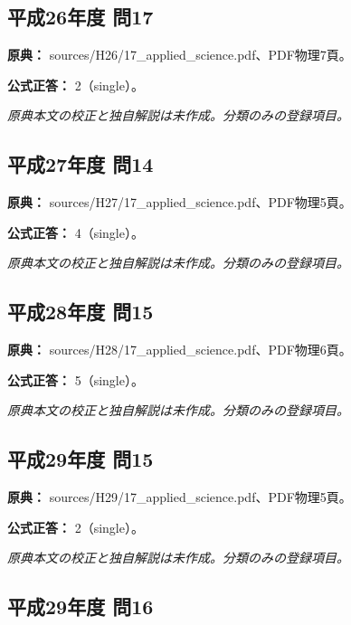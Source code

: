 \subsection{平成26年度 問17}
\label{q:h26-reg-applied-17}

\noindent\textbf{原典：} sources/H26/17\_applied\_science.pdf、PDF物理7頁。

\textbf{公式正答：} 2（single）。

\par\textit{原典本文の校正と独自解説は未作成。分類のみの登録項目。}

\subsection{平成27年度 問14}
\label{q:h27-reg-applied-14}

\noindent\textbf{原典：} sources/H27/17\_applied\_science.pdf、PDF物理5頁。

\textbf{公式正答：} 4（single）。

\par\textit{原典本文の校正と独自解説は未作成。分類のみの登録項目。}

\subsection{平成28年度 問15}
\label{q:h28-reg-applied-15}

\noindent\textbf{原典：} sources/H28/17\_applied\_science.pdf、PDF物理6頁。

\textbf{公式正答：} 5（single）。

\par\textit{原典本文の校正と独自解説は未作成。分類のみの登録項目。}

\subsection{平成29年度 問15}
\label{q:h29-reg-applied-15}

\noindent\textbf{原典：} sources/H29/17\_applied\_science.pdf、PDF物理5頁。

\textbf{公式正答：} 2（single）。

\par\textit{原典本文の校正と独自解説は未作成。分類のみの登録項目。}

\subsection{平成29年度 問16}
\label{q:h29-reg-applied-16}

